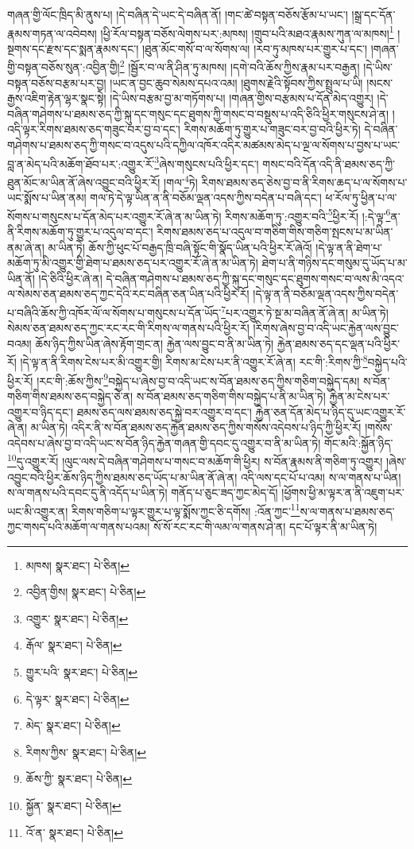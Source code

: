 གཞན་གྱི་ལོང་ཁྲིད་མི་ནུས་པ། །དེ་བཞིན་དེ་ཡང་དེ་བཞིན་ནོ། །གང་ཚེ་བསྟན་བཅོས་རྩོམ་པ་ཡང་། །སྒྲ་དང་དོན་རྣམས་གཏན་ལ་འབེབས། །ཕྱི་རོལ་བསྟན་བཅོས་ལེགས་པར་:མཁས། །གྲུབ་པའི་མཐའ་རྣམས་ཀུན་ལ་མཁས།\footnote{མཁས།  སྣར་ཐང་།  པེ་ཅིན། } །སྔགས་དང་རྫས་དང་སྨན་རྣམས་དང་། །ཐུན་མོང་གསོ་བ་ལ་སོགས་ལ། །རབ་ཏུ་མཁས་པར་གྱུར་པ་དང་། །གཞན་གྱི་བསྟན་བཅོས་སུན་:འབྱིན་གྱི།\footnote{འབྱིན་གྱིས།  སྣར་ཐང་།  པེ་ཅིན། } །སྦྱོར་བ་ལ་ནི་ཤིན་ཏུ་མཁས། །དགེ་བའི་ཆོས་ཀྱིས་རྣམ་པར་བརྒྱན། །དེ་ཡིས་བསྟན་བཅོས་བརྩམ་པར་བྱ། །ཡང་ན་བྱང་ཆུབ་སེམས་དཔའ་འམ། །ཐུགས་རྗེའི་སྟོབས་ཀྱིས་སྤྲུལ་པ་ཡི། །སངས་རྒྱས་འཇིག་རྟེན་ལྷར་སྣང་སྟེ། །དེ་ཡིས་བརྩམ་བྱ་མ་གཏོགས་པ། །གཞན་གྱིས་བརྩམས་པ་དོན་མེད་འགྱུར། །དེ་བཞིན་གཤེགས་པ་ཐམས་ཅད་ཀྱི་སྐུ་དང་གསུང་དང་ཐུགས་ཀྱི་གསང་བ་བསྡུས་པ་འདི་ཅིའི་ཕྱིར་གསུངས་ཤེ་ན། །འདི་ལྟར་རིགས་ཐམས་ཅད་གཟུང་བར་བྱ་བ་དང་། རིགས་མཆོག་ཏུ་གྱུར་པ་གཟུང་བར་བྱ་བའི་ཕྱིར་ཏེ། དེ་བཞིན་གཤེགས་པ་ཐམས་ཅད་ཀྱི་གསང་བ་འདུས་པའི་དཀྱིལ་འཁོར་འདིར་མཚམས་མེད་པ་ལྔ་ལ་སོགས་པ་བྱས་པ་ཡང་བླ་ན་མེད་པའི་མཆོག་ཐོབ་པར་:འགྱུར་རོ་\footnote{འགྱུར་  སྣར་ཐང་།  པེ་ཅིན། }ཞེས་གསུངས་པའི་ཕྱིར་དང་། གསང་བའི་དོན་འདི་ནི་ཐམས་ཅད་ཀྱི་ཐུན་མོང་མ་ཡིན་ནོ་ཞེས་འབྱུང་བའི་ཕྱིར་རོ། །གལ་\footnote{རྒོལ་  སྣར་ཐང་།  པེ་ཅིན། }ཏེ། རིགས་ཐམས་ཅད་ཅེས་བྱ་བ་ནི་རིགས་ཆད་པ་ལ་སོགས་པ་ཡང་སྨོས་པ་ཡིན་ནམ། གལ་ཏེ་དེ་ལྟ་ཡིན་ན་ནི་བཅོམ་ལྡན་འདས་ཀྱིས་བདེན་པ་བཞི་དང་། ཕ་རོལ་ཏུ་ཕྱིན་པ་ལ་སོགས་པ་གསུངས་པ་དོན་མེད་པར་འགྱུར་རོ་ཞེ་ན་མ་ཡིན་ཏེ། རིགས་མཆོག་ཏུ་:འགྱུར་བའི་\footnote{གྱུར་པའི་  སྣར་ཐང་།  པེ་ཅིན། }ཕྱིར་རོ། །:དེ་ལྟ་\footnote{དེ་ལྟར་  སྣར་ཐང་།  པེ་ཅིན། }ན་ནི་རིགས་མཆོག་ཏུ་གྱུར་པ་འདུལ་བ་དང་། རིགས་ཐམས་ཅད་པ་འདུལ་བ་གཅིག་གིས་གཅིག་སྤངས་པ་མ་ཡིན་ནམ་ཞེ་ན། མ་ཡིན་ཏེ། ཆོས་ཀྱི་ཕུང་པོ་བརྒྱད་ཁྲི་བཞི་སྟོང་གི་སྣོད་ཡིན་པའི་ཕྱིར་རོ་ཞེའོ། །དེ་ལྟ་ན་ནི་ཐེག་པ་མཆོག་ཏུ་མི་འགྱུར་གྱི་ཐེག་པ་ཐམས་ཅད་པར་འགྱུར་རོ་ཞེ་ན་མ་ཡིན་ཏེ། ཐེག་པ་ནི་གཉིས་དང་གསུམ་དུ་ཡོད་པ་མ་ཡིན་ནོ། །དེ་ཅིའི་ཕྱིར་ཞེ་ན། དེ་བཞིན་གཤེགས་པ་ཐམས་ཅད་ཀྱི་སྐུ་དང་གསུང་དང་ཐུགས་གསང་བ་ལས་མི་འདའ་ལ་སེམས་ཅན་ཐམས་ཅད་ཀྱང་དེའི་རང་བཞིན་ཅན་ཡིན་པའི་ཕྱིར་རོ། །དེ་ལྟ་ན་ནི་བཅོམ་ལྡན་འདས་ཀྱིས་བདེན་པ་བཞིའི་ཆོས་ཀྱི་འཁོར་ལོ་ལ་སོགས་པ་གསུངས་པ་དོན་ཡོད་\footnote{མེད་  སྣར་ཐང་།  པེ་ཅིན། }པར་འགྱུར་ཏེ་སྔ་མ་བཞིན་ནོ་ཞེ་ན། མ་ཡིན་ཏེ། སེམས་ཅན་ཐམས་ཅད་ཀྱང་རང་རང་གི་རིགས་ལ་གནས་པའི་ཕྱིར་རོ། །རིགས་ཞེས་བྱ་བ་འདི་ཡང་རྐྱེན་ལས་བྱུང་བའམ། ཆོས་ཉིད་ཀྱིས་ཡིན་ཞེས་རྟོག་གྲང་ན། རྐྱེན་ལས་བྱུང་བ་ནི་མ་ཡིན་ཏེ། རྐྱེན་ཐམས་ཅད་དང་ལྡན་པའི་ཕྱིར་རོ། །དེ་ལྟ་ན་ནི་རིགས་ངེས་པར་མི་འགྱུར་གྱི། རིགས་མ་ངེས་པར་ནི་འགྱུར་རོ་ཞེ་ན། རང་གི་:རིགས་ཀྱི་\footnote{རིགས་ཀྱིས་  སྣར་ཐང་།  པེ་ཅིན། }བསྐྱེད་པའི་ཕྱིར་རོ། །རང་གི་:ཆོས་ཀྱིས་\footnote{ཆོས་ཀྱི་  སྣར་ཐང་།  པེ་ཅིན། }བསྐྱེད་པ་ཞེས་བྱ་བ་འདི་ཡང་ས་བོན་ཐམས་ཅད་ཀྱིས་གཅིག་བསྐྱེད་དམ། ས་བོན་གཅིག་གིས་ཐམས་ཅད་བསྐྱེད་ཅེ་ན། ས་བོན་ཐམས་ཅད་གཅིག་གིས་བསྐྱེད་པ་ནི་མ་ཡིན་ཏེ། རྐྱེན་མ་ངེས་པར་འགྱུར་བ་ཉིད་དང་། ཐམས་ཅད་ལས་ཐམས་ཅད་སྐྱེ་བར་འགྱུར་བ་དང་། རྐྱེན་ཅན་དོན་མེད་པ་ཉིད་དུ་ཡང་འགྱུར་རོ་ཞེ་ན། མ་ཡིན་ཏེ། འདིར་ནི་ས་བོན་ཐམས་ཅད་རྐྱེན་ཐམས་ཅད་ཀྱིས་གསོས་འདེབས་པ་ཉིད་ཀྱི་ཕྱིར་རོ། །གསོས་འདེབས་པ་ཞེས་བྱ་བ་འདི་ཡང་ས་བོན་ཉིད་རྐྱེན་གཞན་གྱི་དབང་དུ་འགྱུར་བ་ནི་མ་ཡིན་ཏེ། གོང་མའི་:སྐྱོན་ཉིད་\footnote{སྐྱོན་  སྣར་ཐང་།  པེ་ཅིན། }དུ་འགྱུར་རོ། །ལུང་ལས་དེ་བཞིན་གཤེགས་པ་གསང་བ་མཆོག་གི་ཕྱིར། ས་བོན་རྣམས་ནི་གཅིག་ཏུ་འགྱུར། །ཞེས་འབྱུང་བའི་ཕྱིར་ཆོས་ཉིད་ཀྱིས་ཐམས་ཅད་ཡོད་པ་མ་ཡིན་ནོ་ཞེ་ན། འདི་ལས་དང་པོ་པ་འམ། ས་ལ་གནས་པ་ཡིན། ས་ལ་གནས་པའི་དབང་དུ་ནི་འདོད་པ་ཡིན་ཏེ། གནོད་པ་ཅུང་ཟད་ཀྱང་མེད་དོ། །ཕྱོགས་ཕྱི་མ་ལྟར་ན་ནི་འཇུག་པར་ཡང་མི་འགྱུར་ན། རིགས་གཅིག་པ་ལྟར་གྱུར་པ་ལྟ་སྨོས་ཀྱང་ཅི་དགོས། :འོན་ཀྱང་\footnote{འོ་ན་  སྣར་ཐང་།  པེ་ཅིན། }ས་ལ་གནས་པ་ཐམས་ཅད་ཀྱང་གསད་པའི་མཆོག་ལ་གནས་པའམ། སོ་སོ་རང་རང་གི་ལམ་ལ་གནས་ཤེ་ན། དང་པོ་ལྟར་ནི་མ་ཡིན་ཏེ། 